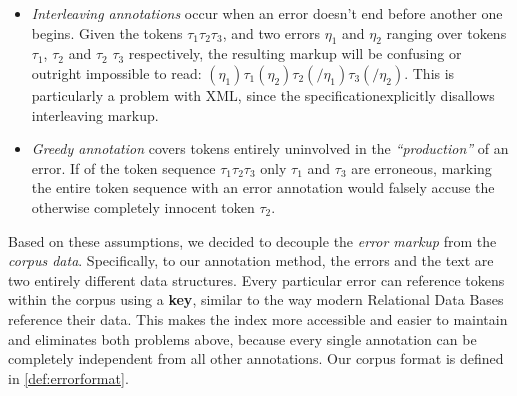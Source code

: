 \documentclass{article}
\begin{document}
\begin{itemize}
\item \textit{Interleaving annotations} occur when an error doesn't end before
another one begins. Given the tokens $\tau_1 \tau_2 \tau_3$, and two errors
$\eta_1$ and
$\eta_2$ ranging over tokens $\tau_1$, $\tau_2$ and $\tau_2$ $\tau_3$ respectively, the
resulting markup will be confusing or outright impossible to read: $(\eta_1)\tau_1
(\eta_2)\tau_2(/\eta_1)\tau_3(/\eta_2)$. This is particularly a problem with XML,
since the specification\footnotemark explicitly disallows interleaving
markup.
\item \textit{Greedy annotation} covers tokens entirely uninvolved in the
\textit{``production''} of an error. If of the token sequence $\tau_1 \tau_2
\tau_3$ only $\tau_1$
and $\tau_3$ are erroneous,
marking the entire token sequence with an error annotation would falsely accuse
the
otherwise completely innocent token $\tau_2$.
\end{itemize}

Based on these assumptions, we decided to decouple the \textit{error markup}
from the \textit{corpus data}. Specifically, to our annotation method, the
errors and the text are two entirely different data structures. Every particular
error can reference tokens within the corpus using a \textbf{key}, similar to
the way modern Relational Data Bases reference their data. This makes the index
more accessible and easier to maintain and eliminates both problems above,
because every single annotation can be completely independent from all other
annotations. Our corpus format is defined in \ref{def:errorformat}.
\end{document}
